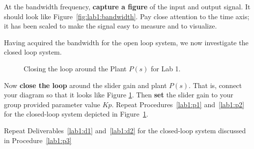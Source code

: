 %
\begin{deliverable}
  At the bandwidth frequency,
  \textbf{capture a figure} of the input and output signal. It should look
  like Figure~\ref{fig:lab1:bandwidth}. Pay close attention to the time
  axis; it has been scaled to make the signal easy to measure and to visualize.
  \label{lab1:d2}
\end{deliverable}
%
Having acquired the bandwidth for the open loop system, we now investigate
the closed loop system.
%
\begin{figure}
  \centering
  \caption{
    Closing the loop around the Plant \(P(s)\) for Lab 1.
  }
  \label{fig:lab1:closing-loop}
\end{figure}
%
\begin{procedure}
  Now \textbf{close the loop} around the slider gain and plant \(P(s).\) That
  is, connect your diagram so that it looks like Figure
  \ref{fig:lab1:closing-loop}. Then \textbf{set} the slider gain to
  your group provided parameter value \(Kp.\)
  Repeat Procedures~\ref{lab1:p1} and~\ref{lab1:p2} for the closed-loop
  system depicted in Figure~\ref{fig:lab1:closing-loop}.
  \label{lab1:p3}
\end{procedure}
%
\begin{deliverable}
  Repeat Deliverables~\ref{lab1:d1} and~\ref{lab1:d2} for the closed-loop
  system discussed in Procedure~\ref{lab1:p3}
\end{deliverable}

